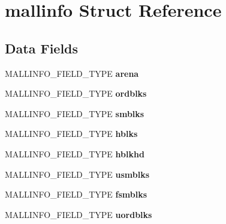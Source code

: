 \hypertarget{structmallinfo}{}\section{mallinfo Struct Reference}
\label{structmallinfo}
\subsection*{Data Fields}
\begin{DoxyCompactItemize}
\item 
M\+A\+L\+L\+I\+N\+F\+O\+\_\+\+F\+I\+E\+L\+D\+\_\+\+T\+Y\+PE {\bfseries arena}\hypertarget{structmallinfo_a2dd8e574430e788f53919db129f2a2ff}{}\label{structmallinfo_a2dd8e574430e788f53919db129f2a2ff}

\item 
M\+A\+L\+L\+I\+N\+F\+O\+\_\+\+F\+I\+E\+L\+D\+\_\+\+T\+Y\+PE {\bfseries ordblks}\hypertarget{structmallinfo_afaac6d1e005097fa1ed835684e23bfa7}{}\label{structmallinfo_afaac6d1e005097fa1ed835684e23bfa7}

\item 
M\+A\+L\+L\+I\+N\+F\+O\+\_\+\+F\+I\+E\+L\+D\+\_\+\+T\+Y\+PE {\bfseries smblks}\hypertarget{structmallinfo_a93076145f3f542dfe5e4e6d1e3feaf0b}{}\label{structmallinfo_a93076145f3f542dfe5e4e6d1e3feaf0b}

\item 
M\+A\+L\+L\+I\+N\+F\+O\+\_\+\+F\+I\+E\+L\+D\+\_\+\+T\+Y\+PE {\bfseries hblks}\hypertarget{structmallinfo_aaf01c52dcd016834ae176885fa32b550}{}\label{structmallinfo_aaf01c52dcd016834ae176885fa32b550}

\item 
M\+A\+L\+L\+I\+N\+F\+O\+\_\+\+F\+I\+E\+L\+D\+\_\+\+T\+Y\+PE {\bfseries hblkhd}\hypertarget{structmallinfo_ab78bcaeb59449f1a9c292bfe3dde8dbb}{}\label{structmallinfo_ab78bcaeb59449f1a9c292bfe3dde8dbb}

\item 
M\+A\+L\+L\+I\+N\+F\+O\+\_\+\+F\+I\+E\+L\+D\+\_\+\+T\+Y\+PE {\bfseries usmblks}\hypertarget{structmallinfo_a470a5e18a1f5eb3cac48020268ca49b8}{}\label{structmallinfo_a470a5e18a1f5eb3cac48020268ca49b8}

\item 
M\+A\+L\+L\+I\+N\+F\+O\+\_\+\+F\+I\+E\+L\+D\+\_\+\+T\+Y\+PE {\bfseries fsmblks}\hypertarget{structmallinfo_a6b1a33ff0fc95bdab9c79ce271f58003}{}\label{structmallinfo_a6b1a33ff0fc95bdab9c79ce271f58003}

\item 
M\+A\+L\+L\+I\+N\+F\+O\+\_\+\+F\+I\+E\+L\+D\+\_\+\+T\+Y\+PE {\bfseries uordblks}\hypertarget{structmallinfo_a4676f74c10d8bf8b79585b04d520356f}{}\label{structmallinfo_a4676f74c10d8bf8b79585b04d520356f}


\end{DoxyCompactItemize}
